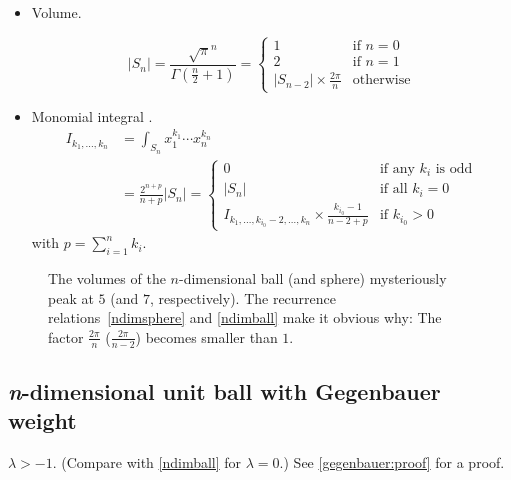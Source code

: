 \documentclass[draft]{scrartcl}
\begin{document}
\begin{itemize}
  \item Volume.

\begin{equation}\label{ndimball}
  |S_n|
  = \frac{\sqrt{\pi}^n}{\Gamma(\frac{n}{2}+1)}
  = \begin{cases}
     1&\text{if $n = 0$}\\
     2&\text{if $n = 1$}\\
     |S_{n-2}| \times \frac{2\pi}{n}&\text{otherwise}
  \end{cases}
\end{equation}

\item Monomial integral \cite{folland}.
\begin{align}\nonumber
  I_{k_1,\dots,k_n}
  &= \int_{S_n} x_1^{k_1}\cdots x_n^{k_n}\\
  &= \frac{2^{n + p}}{n + p} |S_n|
  =\begin{cases}
    0&\text{if any $k_i$ is odd}\\
    |S_n|&\text{if all $k_i=0$}\\
    I_{k_1,\dots,k_{i_0}-2,\dots,k_n} \times \frac{k_{i_0} - 1}{n - 2 + p}&\text{if $k_{i_0} > 0$}
  \end{cases}
\end{align}
with $p=\sum_{i=1}^n k_i$.
\end{itemize}

\begin{figure}
\centering

  \caption{The volumes of the $n$-dimensional ball (and sphere) mysteriously peak at $5$
  (and $7$, respectively). The recurrence relations~\eqref{ndimsphere} and
  \eqref{ndimball} make it obvious why: The factor $\frac{2\pi}{n}$ ($\frac{2\pi}{n-2}$)
  becomes smaller than $1$.}
\end{figure}

\subsection*{\textit{n}-dimensional unit ball with Gegenbauer weight}
  $\lambda > -1.$ (Compare with \eqref{ndimball} for $\lambda = 0$.) See
  \ref{gegenbauer:proof} for a proof.
\end{document}
